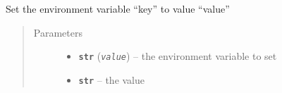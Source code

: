 \documentclass[a4paper,10pt,english]{sphinxmanual}
\begin{document}
\begin{fulllineitems}
\begin{fulllineitems}
\begin{quote}
\begin{description}
\end{description}\end{quote}

\end{fulllineitems}


\begin{fulllineitems}
\label{commands/apidoc/src:src.fileEnviron.BashFileEnviron.set}
Set the environment variable ``key'' to value ``value''
\begin{quote}\begin{description}
\item[{Parameters}] \leavevmode\begin{itemize}
\item {} 
\textbf{\texttt{str}} (\emph{\texttt{value}}) -- the environment variable to set

\item {} 
\textbf{\texttt{str}} -- the value

\end{itemize}

\end{description}\end{quote}

\end{fulllineitems}


\end{fulllineitems}

\end{document}

